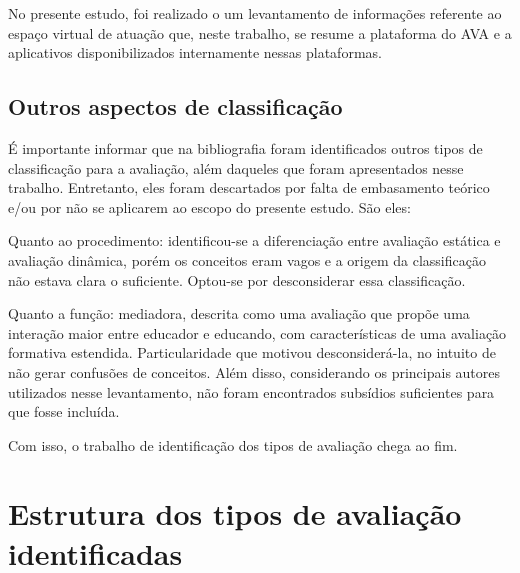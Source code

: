 No presente estudo, foi realizado o um levantamento de informações referente ao espaço virtual de atuação que, neste trabalho, se resume a plataforma do AVA e a aplicativos disponibilizados internamente nessas plataformas. 

\subsection{Outros aspectos de classificação}%
É importante informar que na bibliografia foram identificados outros tipos de classificação para a avaliação, além daqueles que foram apresentados nesse trabalho. Entretanto, eles foram descartados por falta de embasamento teórico e/ou por não se aplicarem ao escopo do presente estudo. São eles:

Quanto ao procedimento: identificou-se a diferenciação entre avaliação estática e avaliação dinâmica, porém os conceitos eram vagos e a origem da classificação não estava clara o suficiente. Optou-se por desconsiderar essa classificação.

Quanto a função: mediadora, descrita como uma avaliação que propõe uma interação maior entre educador e educando, com características de uma avaliação formativa estendida. Particularidade que motivou desconsiderá-la, no intuito de não gerar confusões de conceitos. Além disso, considerando os principais autores utilizados nesse levantamento, não foram encontrados subsídios suficientes para que fosse incluída. 

Com isso, o trabalho de identificação dos tipos de avaliação chega ao fim. 

\section{Estrutura dos tipos de avaliação identificadas}%


